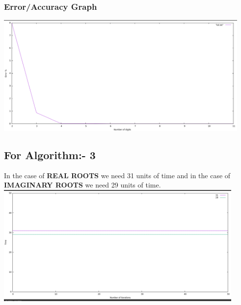 \documentclass[conference]{IEEEtran}
\begin{document}
\subsubsection{\textbf{Error/Accuracy Graph}}
\includegraphics[height =  6.00cm,width = \linewidth]{errorex.png}

\subsection{For Algorithm:- 3}
In the case of \textbf{REAL ROOTS} we need 31 units of time and in the case of \textbf{IMAGINARY ROOTS} we need 29 units of time.
\includegraphics[height =  6.00cm,width = \linewidth]{quad2.png}
\end{document}
